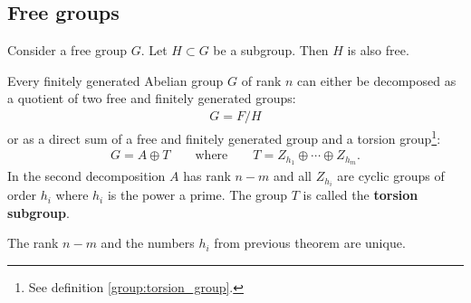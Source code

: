 \subsection{Free groups}

    \begin{property}[Subgroups]
        Consider a free group $G$. Let $H\subset G$ be a subgroup. Then $H$ is also free.
    \end{property}

    \begin{theorem}\label{group:theorem:free_group}
        Every finitely generated Abelian group $G$ of rank $n$ can either be decomposed as a quotient of two free and finitely generated groups:
        \begin{gather}
            G = F/H
        \end{gather}
        or as a direct sum of a free and finitely generated group and a torsion group\footnote{See definition \ref{group:torsion_group}.}:
        \begin{gather}
            G = A\oplus T\qquad\text{where}\qquad T = Z_{h_1}\oplus\cdots\oplus Z_{h_m}.
        \end{gather}
        In the second decomposition $A$ has rank $n-m$ and all $Z_{h_i}$ are cyclic groups of order $h_i$ where $h_i$ is the power a prime. The group $T$ is called the \textbf{torsion subgroup}.
    \end{theorem}
    \begin{property}[Uniqueness]
        The rank $n-m$ and the numbers $h_i$ from previous theorem are unique.
    \end{property}

